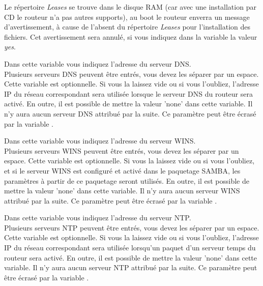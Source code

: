 \begin{description}

    {Le répertoire \emph{Leases} se trouve dans le disque RAM (car avec une
    installation par CD le routeur n'a pas autres supports), au boot le routeur
    enverra un message d'avertissement, à cause de l'absent du répertoire \emph{Leases}
    pour l'installation des fichiers. Cet avertissement sera annulé, si vous
    indiquez dans la variable  la valeur \emph{yes}.}


    {Dans cette variable vous indiquez l'adresse du serveur DNS. \\
	Plusieurs serveurs DNS peuvent être entrés, vous devez les séparer par un espace.
	Cette variable est optionnelle. Si vous la laissez vide ou si vous l'oubliez,
	l'adresse IP du réseau correspondant sera utilisée lorsque le serveur DNS du routeur
	sera activé. En outre, il est possible de mettre la valeur 'none' dans cette variable.
	Il n'y aura aucun serveur DNS attribué par la suite. Ce paramètre peut être écrasé
	par la variable
	.}
    

    {Dans cette variable vous indiquez l'adresse du serveur WINS. \\
	Plusieurs serveurs WINS peuvent être entrés, vous devez les séparer par un espace.
	Cette variable est optionnelle. Si vous la laissez vide ou si vous l'oubliez, et
	si le serveur WINS est configuré et activé dans le paquetage SAMBA, les paramètres à
	partir de ce paquetage seront utilisés. En outre, il est possible de mettre la valeur
	'none' dans cette variable. Il n'y aura aucun serveur WINS attribué par la suite.
	Ce paramètre peut être écrasé par la variable
	.}


    {Dans cette variable vous indiquez l'adresse du serveur NTP. \\
	Plusieurs serveurs NTP peuvent être entrés, vous devez les séparer par un espace.
	Cette variable est optionnelle. Si vous la laissez vide ou si vous l'oubliez,
	l'adresse IP du réseau correspondant sera utilisée lorsqu'un paquet d'un serveur temps
	du routeur sera activé. En outre, il est possible de mettre la valeur 'none' dans cette
	variable. Il n'y aura aucun serveur NTP attribué par la suite. Ce paramètre peut être
	écrasé par la variable
	.}
    

\end{description}
